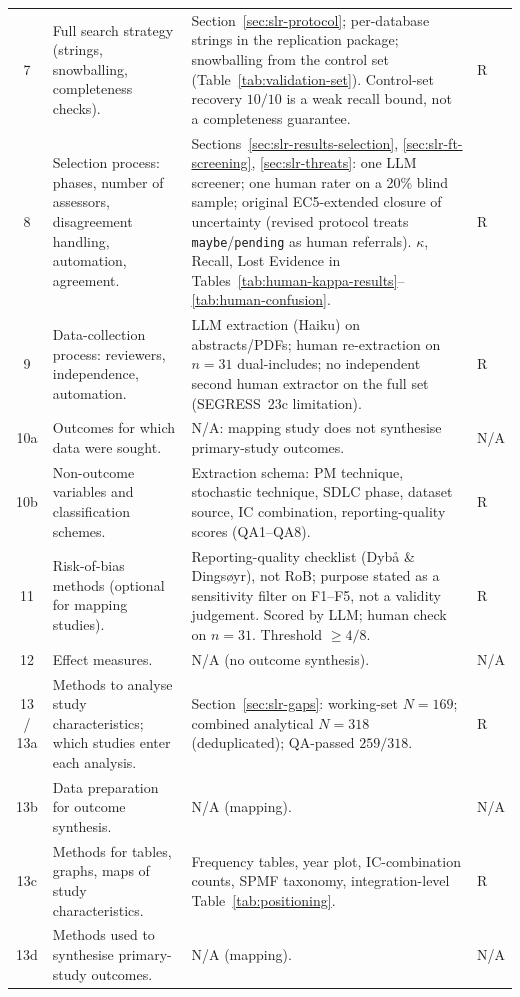 \begin{longtable}{c p{4.4cm} p{6.6cm} l}
7 & Full search strategy (strings, snowballing, completeness checks). & Section~\ref{sec:slr-protocol}; per-database strings in the replication package; snowballing from the control set (Table~\ref{tab:validation-set}). Control-set recovery $10/10$ is a weak recall bound, not a completeness guarantee. & R \\
8 & Selection process: phases, number of assessors, disagreement handling, automation, agreement. & Sections~\ref{sec:slr-results-selection}, \ref{sec:slr-ft-screening}, \ref{sec:slr-threats}: one LLM screener; one human rater on a 20\% blind sample; original EC5-extended closure of uncertainty (revised protocol treats \texttt{maybe}/\texttt{pending} as human referrals). $\kappa$, Recall, Lost Evidence in Tables~\ref{tab:human-kappa-results}--\ref{tab:human-confusion}. & R \\
9 & Data-collection process: reviewers, independence, automation. & LLM extraction (Haiku) on abstracts/PDFs; human re-extraction on $n=31$ dual-includes; no independent second human extractor on the full set (SEGRESS~23c limitation). & R \\
10a & Outcomes for which data were sought. & N/A: mapping study does not synthesise primary-study outcomes. & N/A \\
10b & Non-outcome variables and classification schemes. & Extraction schema: PM technique, stochastic technique, SDLC phase, dataset source, IC combination, reporting-quality scores (QA1--QA8). & R \\
11 & Risk-of-bias methods (optional for mapping studies). & Reporting-quality checklist (Dyb{\aa} \& Dings{\o}yr), not RoB; purpose stated as a sensitivity filter on F1--F5, not a validity judgement. Scored by LLM; human check on $n=31$. Threshold $\geq 4/8$. & R \\
12 & Effect measures. & N/A (no outcome synthesis). & N/A \\
13 / 13a & Methods to analyse study characteristics; which studies enter each analysis. & Section~\ref{sec:slr-gaps}: working-set $N=169$; combined analytical $N=318$ (deduplicated); QA-passed $259/318$. & R \\
13b & Data preparation for outcome synthesis. & N/A (mapping). & N/A \\
13c & Methods for tables, graphs, maps of study characteristics. & Frequency tables, year plot, IC-combination counts, SPMF taxonomy, integration-level Table~\ref{tab:positioning}. & R \\
13d & Methods used to synthesise primary-study outcomes. & N/A (mapping). & N/A \\

\end{longtable}
